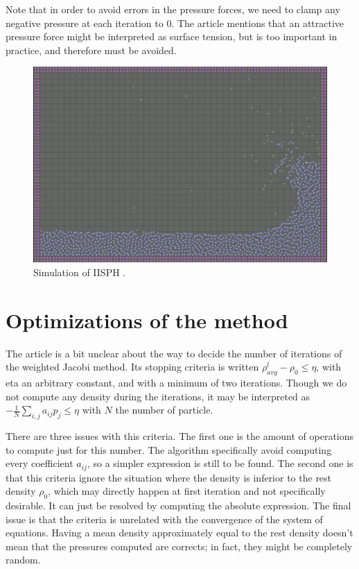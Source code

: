 \documentclass[acmtog, authorversion]{acmart}
\begin{document}
Note that in order to avoid errors in the pressure forces, we need to clamp any negative pressure at each iteration to 0.
The article mentions that an attractive pressure force might be interpreted as surface tension, but is too important in practice, and therefore must be avoided.

\begin{figure}
  \centering
  \includegraphics[width=\linewidth]{Wave.png}
  \caption{Simulation of IISPH  \cite{IISPH}.}
  \label{fig:IISPH_first_implementation}
\end{figure}

\section{Optimizations of the method}

The article \cite{IISPH} is a bit unclear about the way to decide the number of iterations of the weighted Jacobi method.
Its stopping criteria is written $\rho_{avg}^l - \rho_0 \le \eta$, with eta an arbitrary constant, and with a minimum of two iterations.
Though we do not compute any density during the iterations, it may be interpreted as $-\frac{1}{N}\sum_{i,j}a_{ij}p_j \le \eta$ with $N$ the number of particle.

There are three issues with this criteria. The first one is the amount of operations to compute just for this number. The algorithm specifically avoid computing every coefficient $a_{ij}$, so a simpler expression is still to be found.
The second one is that this criteria ignore the situation where the density is inferior to the rest density $\rho_0$, which may directly happen at first iteration and not specifically desirable. It can just be resolved by computing the absolute expression.
The final issue is that the criteria is unrelated with the convergence of the system of equations. Having a mean density approximately equal to the rest density doesn't mean that the pressures computed are corrects; in fact, they might be completely random.
\end{document}
